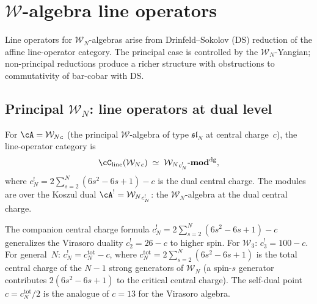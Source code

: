 \section{$\mathcal{W}$-algebra line operators}

Line operators for $\mathcal{W}_N$-algebras arise from
Drinfeld--Sokolov (DS) reduction of the affine line-operator
category. The principal case is controlled by the
$\mathcal{W}_N$-Yangian; non-principal reductions produce
a richer structure with obstructions to commutativity
of bar-cobar with DS.

\subsection{Principal $\mathcal{W}_N$: line operators at dual level}

\begin{definition}
For $\cA=\mathcal{W}_N{}_{c}$ (the principal
$\mathcal{W}$-algebra of type $\mathfrak{sl}_N$ at
central charge~$c$), the line-operator category is
\begin{equation}
\cC_{\mathrm{line}}(\mathcal{W}_N{}_c)
\;\simeq\;
\mathcal{W}_N{}_{c^!_N}\text{-}\mathbf{mod}^{\mathrm{dg}},
\end{equation}
where $c^!_N=2\sum_{s=2}^{N}(6s^2-6s+1)-c$ is the dual
central charge. The modules are over the Koszul dual
$\cA^!=\mathcal{W}_N{}_{c^!_N}$: the
$\mathcal{W}_N$-algebra at the dual central charge.
\end{definition}

\begin{remark}
The companion central charge formula
$c^!_N=2\sum_{s=2}^{N}(6s^2-6s+1)-c$ generalizes
the Virasoro duality $c^!_2=26-c$ to higher spin.
For $\mathcal{W}_3$: $c^!_3=100-c$. For general~$N$:
$c^!_N=c_N^{\mathrm{tot}}-c$, where
$c_N^{\mathrm{tot}}=2\sum_{s=2}^{N}(6s^2-6s+1)$
is the total central charge of the $N-1$ strong generators
of $\mathcal{W}_N$ (a spin-$s$ generator contributes
$2(6s^2-6s+1)$ to the critical central charge).
The self-dual point $c=c_N^{\mathrm{tot}}/2$ is the analogue
of $c=13$ for the Virasoro algebra.
\end{remark}

